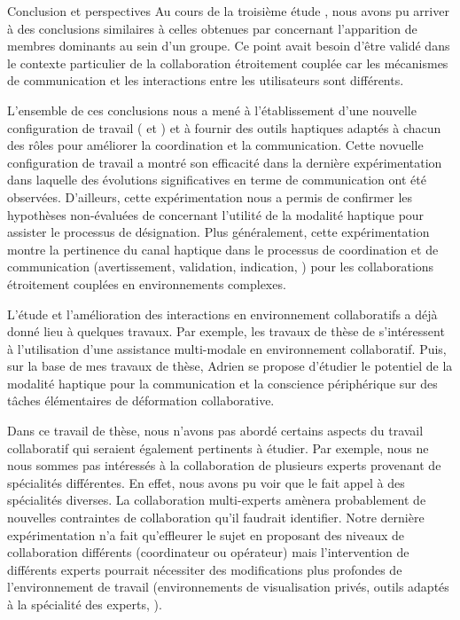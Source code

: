 \documentclass[myfrancais,ngerman,english,french]{mythesis}
\begin{document}
\begin{mychapter+}{Conclusion et perspectives}
		Au cours de la troisième étude , nous avons pu arriver à des conclusions similaires à celles obtenues par  concernant l'apparition de membres dominants au sein d'un groupe.
		Ce point avait besoin d'être validé dans le contexte particulier de la collaboration étroitement couplée car les mécanismes de communication et les interactions entre les utilisateurs sont différents.

		L'ensemble de ces conclusions nous a mené à l'établissement d'une nouvelle configuration de travail ( et ) et à fournir des outils haptiques adaptés à chacun des rôles pour améliorer la coordination et la communication.
		Cette novuelle configuration de travail a montré son efficacité dans la dernière expérimentation  dans laquelle des évolutions significatives en terme de communication ont été observées.
		D'ailleurs, cette expérimentation nous a permis de confirmer les hypothèses non-évaluées de  concernant l'utilité de la modalité haptique pour assister le processus de désignation.
		Plus généralement, cette expérimentation montre la pertinence du canal haptique dans le processus de coordination et de communication (avertissement, validation, indication, \myetc) pour les collaborations étroitement couplées en environnements complexes.

		L'étude et l'amélioration des interactions en environnement collaboratifs a déjà donné lieu à quelques travaux.
		Par exemple, les travaux de thèse de  s'intéressent à l'utilisation d'une assistance multi-modale en environnement collaboratif.
		Puis, sur la base de mes travaux de thèse, Adrien  se propose d'étudier le potentiel de la modalité haptique pour la communication et la conscience périphérique sur des tâches élémentaires de déformation collaborative.

		Dans ce travail de thèse, nous n'avons pas abordé certains aspects du travail collaboratif qui seraient également pertinents à étudier.
		Par exemple, nous ne nous sommes pas intéressés à la collaboration de plusieurs experts provenant de spécialités différentes.
		En effet, nous avons pu voir que le  fait appel à des spécialités diverses.
		La collaboration multi-experts amènera probablement de nouvelles contraintes de collaboration qu'il faudrait identifier.
		Notre dernière expérimentation n'a fait qu'effleurer le sujet en proposant des niveaux de collaboration différents (coordinateur ou opérateur) mais l'intervention de différents experts pourrait nécessiter des modifications plus profondes de l'environnement de travail (environnements de visualisation privés, outils adaptés à la spécialité des experts, \myetc).


\end{mychapter+}
\end{document}
